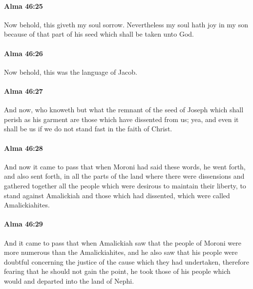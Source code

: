		\paragraph{Alma 46:25} %
			\label{ALMA-46-25}

			Now behold, this giveth my soul sorrow.
			Nevertheless my soul hath joy in my son
			because of that part of his seed which shall be taken unto God.

		\paragraph{Alma 46:26} %
			\label{ALMA-46-26}

			Now behold, this was the language of Jacob.

		\paragraph{Alma 46:27} %
			\label{ALMA-46-27}

			And now, who knoweth but what the remnant of the seed of Joseph
			which shall perish as his garment
			are those which have dissented from us;
			yea, and even it shall be us if we do not stand fast in the faith of Christ.

		\paragraph{Alma 46:28} %
			\label{ALMA-46-28}

			And now it came to pass that
			when Moroni had said these words,
			he went forth, and also sent forth,
			in all the parts of the land where there were dissensions
			and gathered together all the people which were desirous to maintain their liberty,
			to stand against Amalickiah and those which had dissented,
			which were called Amalickiahites.

		\paragraph{Alma 46:29} %
			\label{ALMA-46-29}

			And it came to pass that when Amalickiah saw
			that the people of Moroni were more numerous than the Amalickiahites,
			and he also saw that his people were doubtful
			concerning the justice of the cause which they had undertaken,
			therefore fearing that he should not gain the point,
			he took those of his people which would and departed into the land of Nephi.

